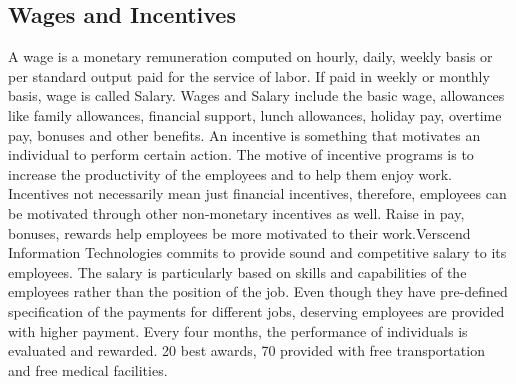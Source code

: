 \subsection{Wages and Incentives}
A wage is a monetary remuneration computed on hourly, daily, weekly basis or per standard output paid for
the service of labor. If paid in weekly or monthly basis, wage is called Salary. Wages and Salary include the
basic wage, allowances like family allowances, financial support, lunch allowances, holiday pay, overtime
pay, bonuses and other benefits.
An incentive is something that motivates an individual to perform certain action. The motive of incentive
programs is to increase the productivity of the employees and to help them enjoy work. Incentives not
necessarily mean just financial incentives, therefore, employees can be motivated through other non-monetary
incentives as well. Raise in pay, bonuses, rewards help employees be more motivated to their work.Verscend
Information Technologies commits to provide sound and competitive salary to its employees. The salary is
particularly based on skills and capabilities of the employees rather than the position of the job. Even though
they have pre-defined specification of the payments for different jobs, deserving employees are provided with
higher payment.
Every four months, the performance of individuals is evaluated and rewarded. 20%
best awards, 70%
provided with free transportation and free medical facilities.
\cleardoublepage
